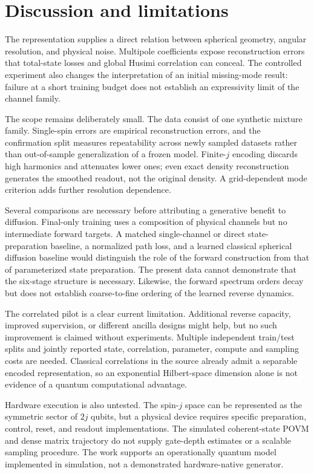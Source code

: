 \section{Discussion and limitations}
The representation supplies a direct relation between spherical geometry, angular resolution, and physical noise. Multipole coefficients expose reconstruction errors that total-state losses and global Husimi correlation can conceal. The controlled experiment also changes the interpretation of an initial missing-mode result: failure at a short training budget does not establish an expressivity limit of the channel family.

The scope remains deliberately small. The data consist of one synthetic mixture family. Single-spin errors are empirical reconstruction errors, and the confirmation split measures repeatability across newly sampled datasets rather than out-of-sample generalization of a frozen model. Finite-$j$ encoding discards high harmonics and attenuates lower ones; even exact density reconstruction generates the smoothed readout, not the original density. A grid-dependent mode criterion adds further resolution dependence.

Several comparisons are necessary before attributing a generative benefit to diffusion. Final-only training uses a composition of physical channels but no intermediate forward targets. A matched single-channel or direct state-preparation baseline, a normalized path loss, and a learned classical spherical diffusion baseline would distinguish the role of the forward construction from that of parameterized state preparation. The present data cannot demonstrate that the six-stage structure is necessary. Likewise, the forward spectrum orders decay but does not establish coarse-to-fine ordering of the learned reverse dynamics.

The correlated pilot is a clear current limitation. Additional reverse capacity, improved supervision, or different ancilla designs might help, but no such improvement is claimed without experiments. Multiple independent train/test splits and jointly reported state, correlation, parameter, compute and sampling costs are needed. Classical correlations in the source already admit a separable encoded representation, so an exponential Hilbert-space dimension alone is not evidence of a quantum computational advantage.

Hardware execution is also untested. The spin-$j$ space can be represented as the symmetric sector of $2j$ qubits, but a physical device requires specific preparation, control, reset, and readout implementations. The simulated coherent-state POVM and dense matrix trajectory do not supply gate-depth estimates or a scalable sampling procedure. The work supports an operationally quantum model implemented in simulation, not a demonstrated hardware-native generator.

